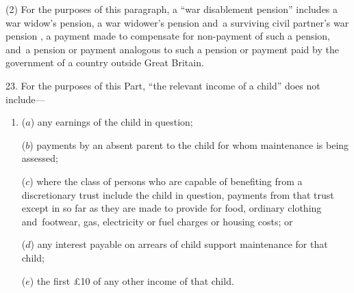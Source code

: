 \documentclass[12pt,a4paper]{article}
\begin{document}
(2) For the purposes of this paragraph, a “war disablement pension” includes 
a war widow’s pension, a war widower’s pension and~a surviving civil partner’s war pension%
, a payment made to compensate for non-payment of such a pension, and~a pension or payment analogous to such a pension or payment paid by the government of a country outside Great Britain.


\medskip

23.  For the purposes of this Part, “the relevant income of a child” does not include—
\begin{enumerate}\item[]
($a$) any earnings of the child in question;

($b$) payments by an absent parent 
to  %
the child for whom maintenance is being assessed;

($c$) where the class of persons who are capable of benefiting from a discretionary trust include the child in question, payments from that trust except in so far as they are made to provide for food, ordinary clothing and~footwear, gas, electricity or fuel charges or housing costs; or

($d$) any interest payable on arrears of child support maintenance for that child;

($e$) the first £10 of any other income of that child.
\end{enumerate}

\end{document}
